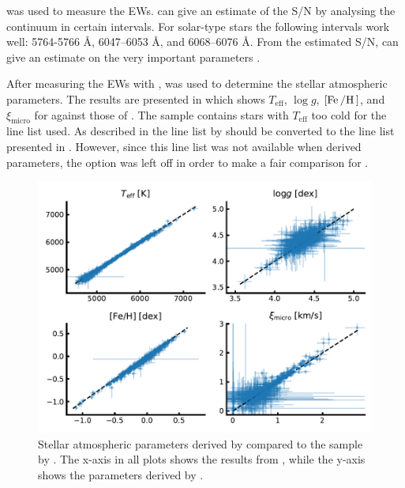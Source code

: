  was used to measure the EWs.  can give an estimate of the S/N by analysing
the continuum in certain intervals. For solar-type stars the following intervals work well:
5764-5766 \AA{}, 6047–6053 \AA{}, and 6068–6076 \AA{}. From the estimated S/N,  can give
an estimate on the very important  parameters \citep[see][for more information]{Sousa2015a}.

After measuring the EWs with ,  was used  to determine the stellar
atmospheric parameters. The results are presented in  which shows
$T_\mathrm{eff}$, $\log g$, $[\ion{Fe}/\ion{H}]$, and $\xi_\mathrm{micro}$ for  against
those of \citet{Sousa2011}. The sample contains stars with $T_\mathrm{eff}$ too cold for the line
list used. As described in  the line list by \citet{Sousa2008a} should be
converted to the line list presented in \citet{Tsantaki2013}. However, since this line list was not
available when \citet{Sousa2011} derived parameters, the  option was left off in
order to make a fair comparison for .

\begin{figure}[htpb!]
    \centering
    \includegraphics[width=1.0\linewidth]{figures/FASMAtest.pdf}
    \caption{Stellar atmospheric parameters derived by  compared to the sample by
             \citet{Sousa2011}. The x-axis in all plots shows the results from , while
             the y-axis shows the parameters derived by \citet{Sousa2011}.}
    \label{fig:fasma_test}
\end{figure}


